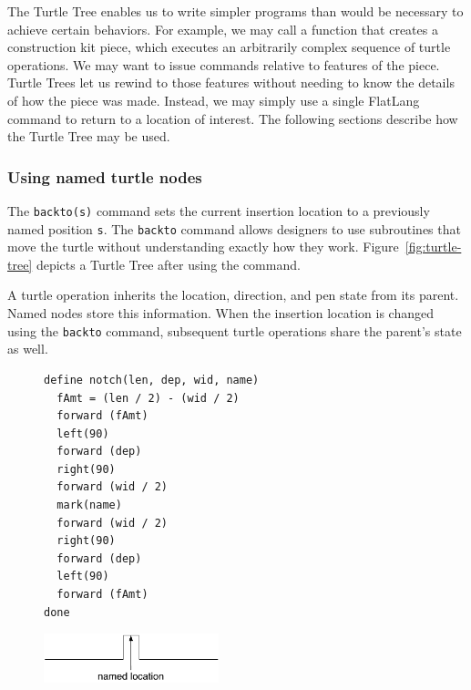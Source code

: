 \documentclass[times, 10pt,twocolumn]{article}
\makeatletter
\newenvironment{subfloat}%
{\def\caption##1{\gdef\subcapsave{\relax##1}}%
\let\subcapsave=\@empty %
\let\sf@oldlabel=\label 
\def\label##1{\xdef\sublabsave{\noexpand\label{##1}}}%
\let\sublabsave\relax %
\setbox\subfigbox\hbox 
\bgroup}%
{\egroup %
\let\label=\sf@oldlabel 
\subfigure[\subcapsave]{\box\subfigbox}}%
\makeatother
\begin{document}
The Turtle Tree enables us to write simpler programs than would be
necessary to achieve certain behaviors. For example, we may call a
function that creates a construction kit piece, which executes an
arbitrarily complex sequence of turtle operations. We may want to
issue commands relative to features of the piece. Turtle Trees let us
rewind to those features without needing to know the details of how
the piece was made. Instead, we may simply use a single
\nohyphens{FlatLang} command to return to a location of interest. The
following sections describe how the Turtle Tree may be used.

\subsubsection{Using named turtle nodes}

The \textnhtt{backto(s)} command sets the current insertion location
to a previously named position \textnhtt{s}. The \textnhtt{backto}
command allows designers to use subroutines that move the turtle
without understanding exactly how they
work. Figure~\ref{fig:turtle-tree} depicts a Turtle Tree after using
the  command.

A turtle operation inherits the location, direction, and pen state
from its parent. Named nodes store this information. When the
insertion location is changed using the \textnhtt{backto} command,
subsequent turtle operations share the parent's state as well.

\begin{figure}

  \begin{subfloat}
    \begin{minipage}{2.6in}
      \small
\begin{verbatim}
define notch(len, dep, wid, name)
  fAmt = (len / 2) - (wid / 2)
  forward (fAmt)
  left(90)
  forward (dep)
  right(90)
  forward (wid / 2)
  mark(name)
  forward (wid / 2)
  right(90)
  forward (dep)
  left(90)
  forward (fAmt)  
done
\end{verbatim}
    \end{minipage}
  \end{subfloat}

  \begin{subfloat}
    \begin{minipage}{}
      \includegraphics[width=2.0in]{notch_graphic.pdf}
    \end{minipage}
  \end{subfloat}

  \caption{A function using \textnhtt{mark} to name a feature in the
    Turtle Tree, illustrated at the bottom.}
  \label{fig:mark}
\end{figure}
\end{document}

